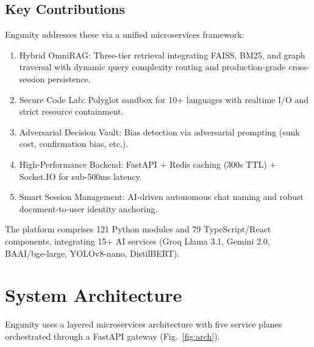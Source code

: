 \documentclass[conference]{IEEEtran}
\begin{document}
\subsection{Key Contributions}
Engunity addresses these via a unified microservices framework:
\begin{enumerate}
    \item Hybrid OmniRAG: Three-tier retrieval integrating FAISS, BM25, and graph traversal with dynamic query complexity routing and production-grade cross-session persistence.
    \item Secure Code Lab: Polyglot sandbox for 10+ languages with realtime I/O and strict resource containment.
    \item Adversarial Decision Vault: Bias detection via adversarial prompting (sunk cost, confirmation bias, etc.).
    \item High-Performance Backend: FastAPI + Redis caching (300s TTL) + Socket.IO for sub-500ms latency.
    \item Smart Session Management: AI-driven autonomous chat naming and robust document-to-user identity anchoring.
\end{enumerate}

The platform comprises 121 Python modules and 79 TypeScript/React components, integrating 15+ AI services (Groq Llama 3.1, Gemini 2.0, BAAI/bge-large, YOLOv8-nano, DistilBERT).


\section{System Architecture}

Engunity uses a layered microservices architecture with five service planes orchestrated through a FastAPI gateway (Fig.~\ref{fig:arch}).
\end{document}
